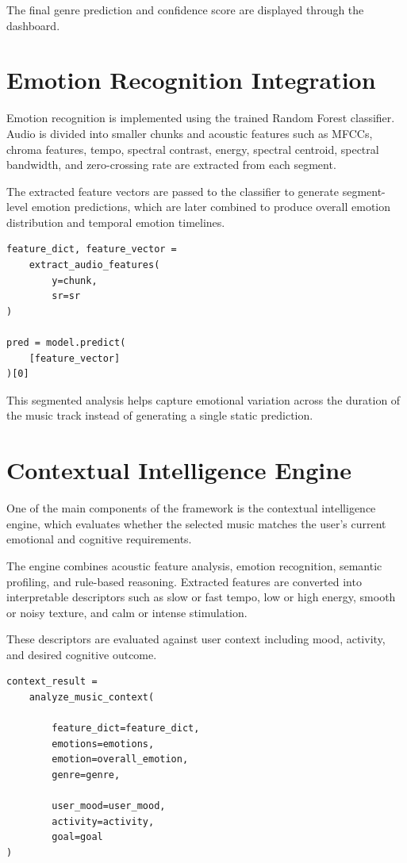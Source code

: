 \documentclass[12pt,a4paper]{report}
\begin{document}
The final genre prediction and confidence score are displayed through the dashboard.

\section{Emotion Recognition Integration}

Emotion recognition is implemented using the trained Random Forest classifier. Audio is divided into smaller chunks and acoustic features such as MFCCs, chroma features, tempo, spectral contrast, energy, spectral centroid, spectral bandwidth, and zero-crossing rate are extracted from each segment.

The extracted feature vectors are passed to the classifier to generate segment-level emotion predictions, which are later combined to produce overall emotion distribution and temporal emotion timelines.

\begin{lstlisting}
feature_dict, feature_vector =
    extract_audio_features(
        y=chunk,
        sr=sr
)

pred = model.predict(
    [feature_vector]
)[0]
\end{lstlisting}

This segmented analysis helps capture emotional variation across the duration of the music track instead of generating a single static prediction.

\section{Contextual Intelligence Engine}

One of the main components of the framework is the contextual intelligence engine, which evaluates whether the selected music matches the user’s current emotional and cognitive requirements.

The engine combines acoustic feature analysis, emotion recognition, semantic profiling, and rule-based reasoning. Extracted features are converted into interpretable descriptors such as slow or fast tempo, low or high energy, smooth or noisy texture, and calm or intense stimulation.

These descriptors are evaluated against user context including mood, activity, and desired cognitive outcome.

\begin{lstlisting}
context_result =
    analyze_music_context(

        feature_dict=feature_dict,
        emotions=emotions,
        emotion=overall_emotion,
        genre=genre,

        user_mood=user_mood,
        activity=activity,
        goal=goal
)
\end{lstlisting}
\end{document}
